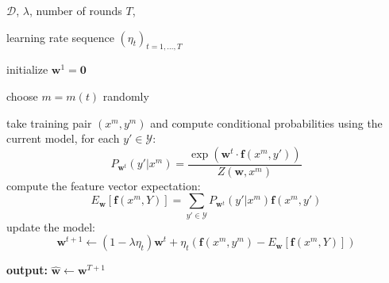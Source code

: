 \begin{algorithm}[t]

   \caption{SGD for Maximum Entropy \label{alg:maxent_sgd}}

\begin{algorithmic}[1]

    $\mathcal{D}$, $\lambda$, number of rounds $T$,

   learning rate sequence $(\eta_t)_{t = 1,\ldots,T}$

   \STATE initialize $\boldsymbol{w}^1 = \mathbf{0}$

	\STATE choose $m = m(t)$ randomly

	\STATE take training pair $(x^m, y^m)$ and compute conditional probabilities using the current model, for each $y' \in \mathcal{Y}$:
	$$P_{\boldsymbol{w}^t}(y'|x^m) = \frac{\exp(\boldsymbol{w}^t \cdot \boldsymbol{f}(x^m,y'))}{Z(\boldsymbol{w},x^m)}$$ 
	\STATE compute the feature vector expectation:  
	$$E_{\boldsymbol{w}}[\boldsymbol{f}(x^m,Y)] = \sum_{y' \in \mathcal{Y}} P_{\boldsymbol{w}^t}(y'|x^m) \boldsymbol{f}(x^m,y')$$
	\STATE update the model: 
	$$\boldsymbol{w}^{t+1} \leftarrow (1-\lambda \eta_t) \boldsymbol{w}^{t} + \eta_t \left( \boldsymbol{f}(x^{m},y^{m}) 
	- E_{\boldsymbol{w}}[\boldsymbol{f}(x^{m},Y)]\right)$$
	\ENDFOR

   \STATE \textbf{output:} $\hat{\boldsymbol{w}} \leftarrow \boldsymbol{w}^{T+1}$

\end{algorithmic}

\end{algorithm}





